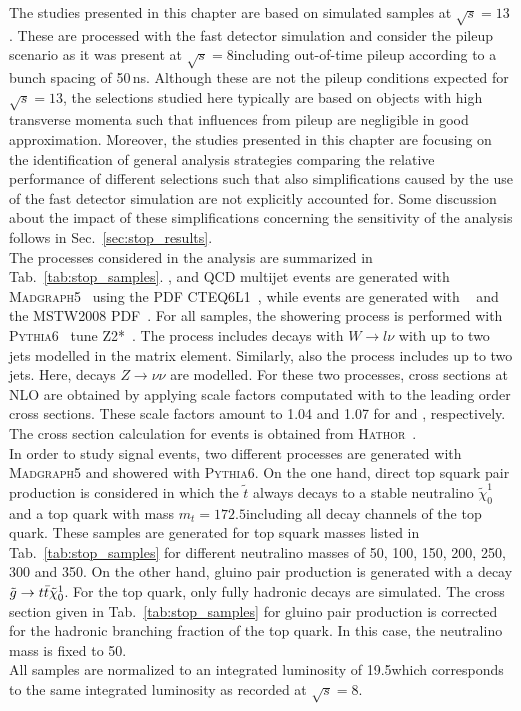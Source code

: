 The studies presented in this chapter are based on simulated samples at $\sqrt{s} = 13$\tev. These are processed with the fast detector simulation and consider the pileup scenario as it was present at $\sqrt{s} = 8$\tev including out-of-time pileup according to a bunch spacing of 50\,ns. Although these are not the pileup conditions expected for $\sqrt{s} = 13$\tev, the selections studied here typically are based on objects with high transverse momenta such that influences from pileup are negligible in good approximation. Moreover, the studies presented in this chapter are focusing on the identification of general analysis strategies comparing the relative performance of different selections such that also simplifications caused by the use of the fast detector simulation are not explicitly accounted for. Some discussion about the impact of these simplifications concerning the sensitivity of the analysis follows in Sec.~\ref{sec:stop_results}.  \\
The processes considered in the analysis are summarized in Tab.~\ref{tab:stop_samples}. \WJets, \ZJets and QCD multijet events are generated with \textsc{Madgraph5}~\cite{Alwall:2014hca} using the PDF CTEQ6L1~\cite{Pumplin:2002vw}, while \ttbar events are generated with \powheg~\cite{Oleari:2010nx} and the MSTW2008 PDF~\cite{Martin:2009iq}. For all samples, the showering process is performed with \textsc{Pythia6}~\cite{Sjostrand:2006za} tune Z2*~\cite{Chatrchyan:2013gfi}. The process \WJets includes decays with $W \rightarrow l \nu$ with up to two jets modelled in the matrix element. Similarly, also the process \ZJets includes up to two jets. Here, decays $Z \rightarrow \nu \nu$ are modelled. For these two processes, cross sections at NLO are obtained by applying scale factors computated with \powheg to the leading order cross sections. These scale factors amount to 1.04 and 1.07 for \WJets and \ZJets, respectively. The cross section calculation for \ttbar events is obtained from \textsc{Hathor}~\cite{Aliev:2010zk}. \\
In order to study signal events, two different processes are generated with \textsc{Madgraph5} and showered with \textsc{Pythia6}. On the one hand, direct top squark pair production is considered in which the $\tilde{t}$ always decays to a stable neutralino $\tilde{\chi}_{0}^{1}$ and a top quark with mass $m_{t} = 172.5$\gev including all decay channels of the top quark. These samples are generated for top squark masses listed in Tab.~\ref{tab:stop_samples} for different neutralino masses of 50, 100, 150, 200, 250, 300 and 350\gev. On the other hand, gluino pair production is generated with a decay $\tilde{g} \rightarrow t\bar{t} \tilde{\chi}_{0}^{1}$. For the top quark, only fully hadronic decays are simulated. The cross section given in Tab.~\ref{tab:stop_samples} for gluino pair production is corrected for the hadronic branching fraction of the top quark. In this case, the neutralino mass is fixed to 50\gev. \\
All samples are normalized to an integrated luminosity of 19.5\fbinv which corresponds to the same integrated luminosity as recorded at $\sqrt{s} =8$\tev.

